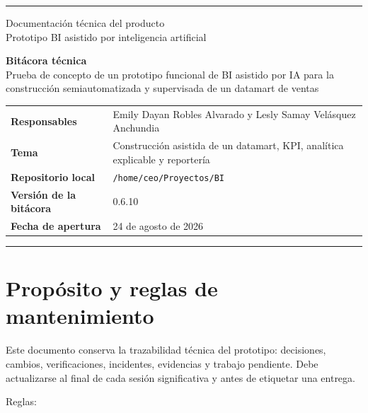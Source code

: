 \documentclass[11pt,letterpaper]{article}
\newcommand{\file}[1]{\texttt{#1}}
\begin{document}
\hypersetup{pageanchor=false}

\begin{titlepage}
  \thispagestyle{empty}
  \vspace*{1.2cm}
  {\color{ugblue}\rule{\textwidth}{2.5pt}}
  \vspace{1.4cm}

  {\Large Documentación técnica del producto\\[0.25em]Prototipo BI asistido por inteligencia artificial}

  \vfill

  {\color{deepgreen}\fontsize{30}{35}\selectfont\textbf{Bitácora técnica}}\\[0.8em]
  {\LARGE Prueba de concepto de un prototipo funcional de BI asistido por IA para la construcción semiautomatizada y supervisada de un datamart de ventas}

  \vspace{1.6cm}

  \begin{tabularx}{\textwidth}{@{}>{\bfseries}l X@{}}
    Responsables & Emily Dayan Robles Alvarado y Lesly Samay Velásquez Anchundia \\
    Tema & Construcción asistida de un datamart, KPI, analítica explicable y reportería \\
    Repositorio local & \file{/home/ceo/Proyectos/BI} \\
    Versión de la bitácora & 0.6.10 \\
    Fecha de apertura & 24 de agosto de 2026 \\
  \end{tabularx}

  \vfill
  {\color{ugblue}\rule{\textwidth}{2.5pt}}
\end{titlepage}

\hypersetup{pageanchor=true}
\tableofcontents
\newpage
{}

\section{Propósito y reglas de mantenimiento}

Este documento conserva la trazabilidad técnica del prototipo: decisiones, cambios, verificaciones, incidentes, evidencias y trabajo pendiente. Debe actualizarse al final de cada sesión significativa y antes de etiquetar una entrega.

Reglas:
\end{document}
